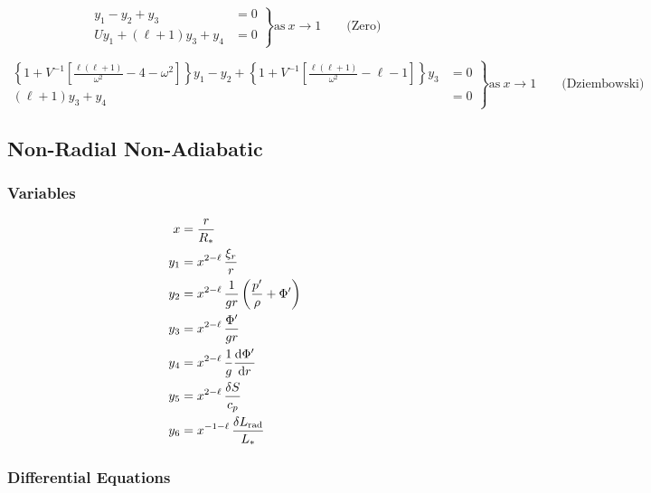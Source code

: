 \documentclass[fleqn]{article}
\newcommand{\diff}{\ensuremath{\mathrm{d}}}
\newcommand{\Rstar}{\ensuremath{R_{\ast}}}
\newcommand{\Lrad}{\ensuremath{L_{\rm rad}}}
\newcommand{\Lstar}{\ensuremath{L_{\ast}}}
\begin{document}
\begin{equation*}
\left.
\begin{aligned}
y_{1} - y_{2} + y_{3} &= 0 \\
U y_{1} + (\ell + 1) y_{3} + y_{4} &= 0
\end{aligned}
\right\}
\text{as}\ x \rightarrow 1 \qquad \text{(Zero)}
\end{equation*}

\begin{equation*}
\left.
\begin{aligned}
\left\{ 1 + V^{-1} \left[ \frac{\ell(\ell+1)}{\omega^{2}} - 4 - \omega^{2} \right] \right\} y_{1} -
y_{2} +
\left\{ 1 + V^{-1} \left[ \frac{\ell(\ell+1)}{\omega^{2}} - \ell - 1 \right] \right\} y_{3} &= 0 \\
(\ell + 1) y_{3} + y_{4} &= 0
\end{aligned}
\right\} 
\text{as}\ x \rightarrow 1 \qquad \text{(Dziembowski)}
\end{equation*}


\newpage

\subsection*{Non-Radial Non-Adiabatic}

\subsubsection*{Variables}

\begin{align*}
x     &= \frac{r}{\Rstar} \\
y_{1} &= x^{2-\ell}\, \frac{\xi_{r}}{r} \\
y_{2} &= x^{2-\ell}\, \frac{1}{gr} \left( \frac{p'}{\rho} + \Phi' \right)\\
y_{3} &= x^{2-\ell}\, \frac{\Phi'}{gr}\\
y_{4} &= x^{2-\ell}\, \frac{1}{g} \frac{\diff \Phi'}{\diff r}\\
y_{5} &= x^{2-\ell}\, \frac{\delta S}{c_{p}}\\
y_{6} &= x^{-1-\ell}\, \frac{\delta \Lrad}{\Lstar}
\end{align*}

\subsubsection*{Differential Equations}
\end{document}
